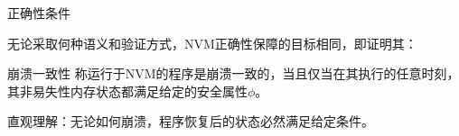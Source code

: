\documentclass{beamer}
\begin{document}
\begin{frame}{正确性条件}

    无论采取何种语义和验证方式，NVM正确性保障的目标相同，即证明其：
    \vfill
    \begin{block}{崩溃一致性}
        称运行于NVM的程序是崩溃一致的，当且仅当在其执行的任意时刻，其非易失性内存状态都满足给定的安全属性$\phi$。
    \end{block}
    \vfill
    直观理解：无论如何崩溃，程序恢复后的状态必然满足给定条件。
\end{frame}


\end{document}
